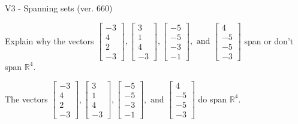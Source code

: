 \begin{exercise}
  \begin{exerciseTitle}V3 - Spanning sets (ver. 660)\end{exerciseTitle}
  \begin{exerciseStatement}
    Explain why the vectors \(\left[\begin{array}{r}
-3 \\
4 \\
2 \\
-3
\end{array}\right] , \left[\begin{array}{r}
3 \\
1 \\
4 \\
-3
\end{array}\right] , \left[\begin{array}{r}
-5 \\
-5 \\
-3 \\
-1
\end{array}\right] , \text{ and } \left[\begin{array}{r}
4 \\
-5 \\
-5 \\
-3
\end{array}\right]\) span or don't span \(\mathbb{R}^4\). 
	


  \end{exerciseStatement}
  \begin{exerciseAnswer}
   The vectors \(\left[\begin{array}{r}
-3 \\
4 \\
2 \\
-3
\end{array}\right] , \left[\begin{array}{r}
3 \\
1 \\
4 \\
-3
\end{array}\right] , \left[\begin{array}{r}
-5 \\
-5 \\
-3 \\
-1
\end{array}\right] , \text{ and } \left[\begin{array}{r}
4 \\
-5 \\
-5 \\
-3
\end{array}\right]\) 
  	 do  
	span \(\mathbb{R}^4\).
  


  \end{exerciseAnswer}
\end{exercise}